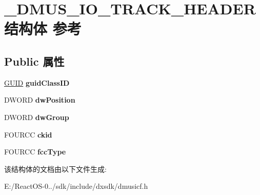\hypertarget{struct___d_m_u_s___i_o___t_r_a_c_k___h_e_a_d_e_r}{}\section{\+\_\+\+D\+M\+U\+S\+\_\+\+I\+O\+\_\+\+T\+R\+A\+C\+K\+\_\+\+H\+E\+A\+D\+E\+R结构体 参考}
\label{struct___d_m_u_s___i_o___t_r_a_c_k___h_e_a_d_e_r}
\subsection*{Public 属性}
\begin{DoxyCompactItemize}
\item 
\mbox{\label{struct___d_m_u_s___i_o___t_r_a_c_k___h_e_a_d_e_r_aef580744429cc8085c89759845c7b208}} 
\hyperlink{interface_g_u_i_d}{G\+U\+ID} {\bfseries guid\+Class\+ID}
\item 
\mbox{\label{struct___d_m_u_s___i_o___t_r_a_c_k___h_e_a_d_e_r_a8344e21a0ae3b09897c336b29d13029d}} 
D\+W\+O\+RD {\bfseries dw\+Position}
\item 
\mbox{\label{struct___d_m_u_s___i_o___t_r_a_c_k___h_e_a_d_e_r_a9cdebaf76839462eea51b87c832f1607}} 
D\+W\+O\+RD {\bfseries dw\+Group}
\item 
\mbox{\label{struct___d_m_u_s___i_o___t_r_a_c_k___h_e_a_d_e_r_a5ed7eae3b128ac4e368cea97bd9172ba}} 
F\+O\+U\+R\+CC {\bfseries ckid}
\item 
\mbox{\label{struct___d_m_u_s___i_o___t_r_a_c_k___h_e_a_d_e_r_af85ac24dca4eeefef4e17f01676daf23}} 
F\+O\+U\+R\+CC {\bfseries fcc\+Type}
\end{DoxyCompactItemize}


该结构体的文档由以下文件生成\+:\begin{DoxyCompactItemize}
\item 
E\+:/\+React\+O\+S-\/0../sdk/include/dxsdk/dmusicf.\+h\end{DoxyCompactItemize}
